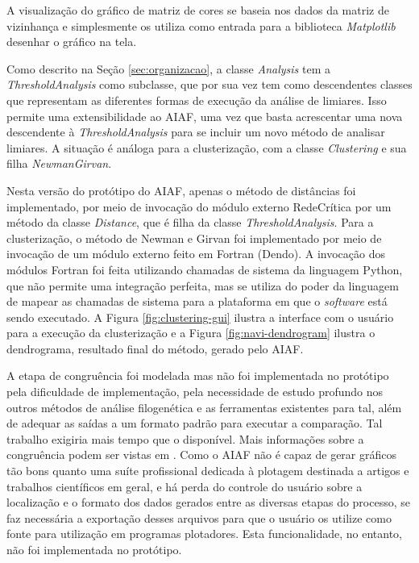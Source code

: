 A visualização do gráfico de matriz de cores se baseia nos dados da matriz de vizinhança e simplesmente os utiliza como entrada para a biblioteca
\textit{Matplotlib} desenhar o gráfico na tela.

Como descrito na Seção \ref{sec:organizacao}, a classe \textit{Analysis} tem a \textit{ThresholdAnalysis} como subclasse,
que por sua vez tem como descendentes classes que representam as diferentes formas de execução da análise de limiares. Isso permite uma extensibilidade
ao AIAF, uma vez que basta acrescentar uma nova descendente à \textit{ThresholdAnalysis} para se incluir um novo método de analisar limiares. A situação
é análoga para a clusterização, com a classe \textit{Clustering} e sua filha \textit{NewmanGirvan}.

Nesta versão do protótipo do AIAF, apenas o método de distâncias foi implementado, por meio de invocação do módulo externo RedeCrítica por um método da
classe \textit{Distance}, que é filha da classe \textit{ThresholdAnalysis}. Para a clusterização, o método de Newman e Girvan foi implementado por meio
de invocação de um módulo externo feito em Fortran (Dendo). A invocação dos módulos Fortran foi feita utilizando chamadas de sistema da linguagem Python,
que não permite uma integração perfeita, mas se utiliza do poder da linguagem de mapear as chamadas de sistema para a plataforma em que o \textit{software}
está sendo executado. A Figura \ref{fig:clustering-gui} ilustra a interface com o usuário para a execução da clusterização e a Figura \ref{fig:navi-dendrogram}
ilustra o dendrograma, resultado final do método, gerado pelo AIAF.

A etapa de congruência foi modelada mas não foi implementada no protótipo pela dificuldade de implementação, pela necessidade de estudo profundo nos outros
métodos de análise filogenética e as ferramentas existentes para tal, além de adequar as saídas a um formato padrão para executar a comparação. Tal trabalho
exigiria mais tempo que o disponível. Mais informações sobre a congruência podem
ser vistas em \cite{marcelo2010}. Como o AIAF não é capaz de gerar gráficos tão bons quanto uma suíte profissional dedicada à plotagem destinada a artigos e
trabalhos científicos em geral, e há perda do controle do usuário sobre a localização e o formato dos dados gerados entre as diversas etapas do processo, se
faz necessária a exportação desses arquivos para que o usuário os utilize como fonte para utilização em programas plotadores.
Esta funcionalidade, no entanto, não foi implementada no protótipo.

